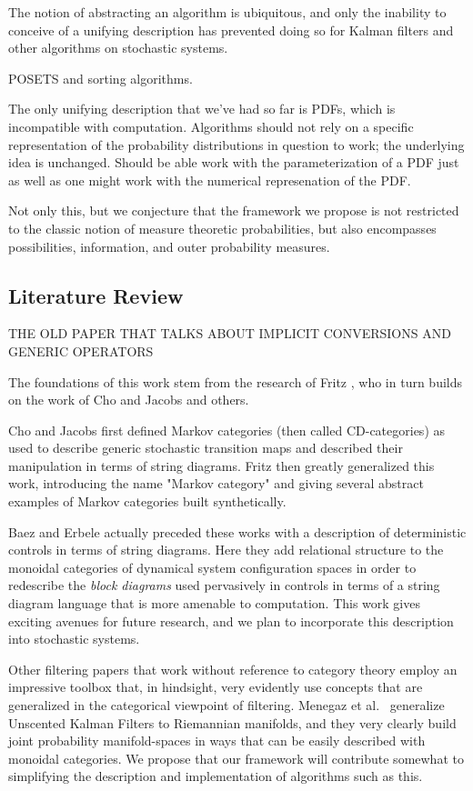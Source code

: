 \documentclass[letterpaper, 10 pt, conference]{ieeeconf}  %
\begin{document}
The notion of abstracting an algorithm is ubiquitous, and only the inability to conceive of a unifying description has prevented doing so for Kalman filters and other algorithms on stochastic systems. 

POSETS and sorting algorithms.

The only unifying description that we've had so far is PDFs, which is incompatible with computation. Algorithms should not rely on a specific representation of the probability distributions in question to work; the underlying idea is unchanged. Should be able work with the parameterization of a PDF just as well as one might work with the numerical represenation of the PDF.

Not only this, but we conjecture that the framework we propose is not restricted to the classic notion of measure theoretic probabilities, but also encompasses possibilities, information, and outer probability measures. 

\subsection{Literature Review}

THE OLD PAPER THAT TALKS ABOUT IMPLICIT CONVERSIONS AND GENERIC OPERATORS

The foundations of this work stem from the research of Fritz \cite{fritz}, who in turn builds on the work of Cho and Jacobs \cite{cho} and others.

Cho and Jacobs first defined Markov categories (then called CD-categories) as used to describe generic stochastic transition maps and described their manipulation in terms of string diagrams. Fritz then greatly generalized this work, introducing the name "Markov category" and giving several abstract examples of Markov categories built synthetically. 

Baez and Erbele \cite{baez} actually preceded these works with a description of deterministic controls in terms of string diagrams. Here they add relational structure to the monoidal categories of dynamical system configuration spaces in order to redescribe the \emph{block diagrams} used pervasively in controls in terms of a string diagram language that is more amenable to computation.
This work gives exciting avenues for future research, and we plan to incorporate this description into stochastic systems.

Other filtering papers that work without reference to category theory employ an impressive toolbox that, in hindsight, very evidently use concepts that are generalized in the categorical viewpoint of filtering.
Menegaz et al.\ \cite{menegaz} generalize Unscented Kalman Filters to Riemannian manifolds, and they very clearly build joint probability manifold-spaces in ways that can be easily described with monoidal categories.
We propose that our framework will contribute somewhat to simplifying the description and implementation of algorithms such as this.
\end{document}
